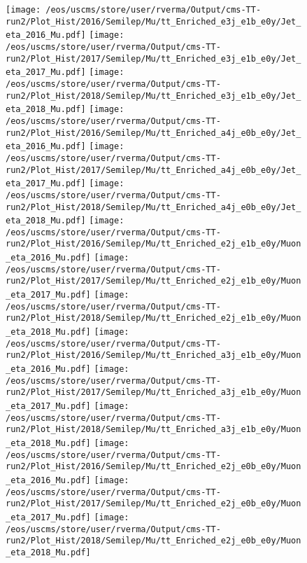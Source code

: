 \begin{figure}
\centering
\texttt{[image: /eos/uscms/store/user/rverma/Output/cms-TT-run2/Plot\_Hist/2016/Semilep/Mu/tt\_Enriched\_e3j\_e1b\_e0y/Jet\_eta\_2016\_Mu.pdf]}
\texttt{[image: /eos/uscms/store/user/rverma/Output/cms-TT-run2/Plot\_Hist/2017/Semilep/Mu/tt\_Enriched\_e3j\_e1b\_e0y/Jet\_eta\_2017\_Mu.pdf]}
\texttt{[image: /eos/uscms/store/user/rverma/Output/cms-TT-run2/Plot\_Hist/2018/Semilep/Mu/tt\_Enriched\_e3j\_e1b\_e0y/Jet\_eta\_2018\_Mu.pdf]}
\texttt{[image: /eos/uscms/store/user/rverma/Output/cms-TT-run2/Plot\_Hist/2016/Semilep/Mu/tt\_Enriched\_a4j\_e0b\_e0y/Jet\_eta\_2016\_Mu.pdf]}
\texttt{[image: /eos/uscms/store/user/rverma/Output/cms-TT-run2/Plot\_Hist/2017/Semilep/Mu/tt\_Enriched\_a4j\_e0b\_e0y/Jet\_eta\_2017\_Mu.pdf]}
\texttt{[image: /eos/uscms/store/user/rverma/Output/cms-TT-run2/Plot\_Hist/2018/Semilep/Mu/tt\_Enriched\_a4j\_e0b\_e0y/Jet\_eta\_2018\_Mu.pdf]}
\texttt{[image: /eos/uscms/store/user/rverma/Output/cms-TT-run2/Plot\_Hist/2016/Semilep/Mu/tt\_Enriched\_e2j\_e1b\_e0y/Muon\_eta\_2016\_Mu.pdf]}
\texttt{[image: /eos/uscms/store/user/rverma/Output/cms-TT-run2/Plot\_Hist/2017/Semilep/Mu/tt\_Enriched\_e2j\_e1b\_e0y/Muon\_eta\_2017\_Mu.pdf]}
\texttt{[image: /eos/uscms/store/user/rverma/Output/cms-TT-run2/Plot\_Hist/2018/Semilep/Mu/tt\_Enriched\_e2j\_e1b\_e0y/Muon\_eta\_2018\_Mu.pdf]}
\texttt{[image: /eos/uscms/store/user/rverma/Output/cms-TT-run2/Plot\_Hist/2016/Semilep/Mu/tt\_Enriched\_a3j\_e1b\_e0y/Muon\_eta\_2016\_Mu.pdf]}
\texttt{[image: /eos/uscms/store/user/rverma/Output/cms-TT-run2/Plot\_Hist/2017/Semilep/Mu/tt\_Enriched\_a3j\_e1b\_e0y/Muon\_eta\_2017\_Mu.pdf]}
\texttt{[image: /eos/uscms/store/user/rverma/Output/cms-TT-run2/Plot\_Hist/2018/Semilep/Mu/tt\_Enriched\_a3j\_e1b\_e0y/Muon\_eta\_2018\_Mu.pdf]}
\texttt{[image: /eos/uscms/store/user/rverma/Output/cms-TT-run2/Plot\_Hist/2016/Semilep/Mu/tt\_Enriched\_e2j\_e0b\_e0y/Muon\_eta\_2016\_Mu.pdf]}
\texttt{[image: /eos/uscms/store/user/rverma/Output/cms-TT-run2/Plot\_Hist/2017/Semilep/Mu/tt\_Enriched\_e2j\_e0b\_e0y/Muon\_eta\_2017\_Mu.pdf]}
\texttt{[image: /eos/uscms/store/user/rverma/Output/cms-TT-run2/Plot\_Hist/2018/Semilep/Mu/tt\_Enriched\_e2j\_e0b\_e0y/Muon\_eta\_2018\_Mu.pdf]}
\end{figure}

